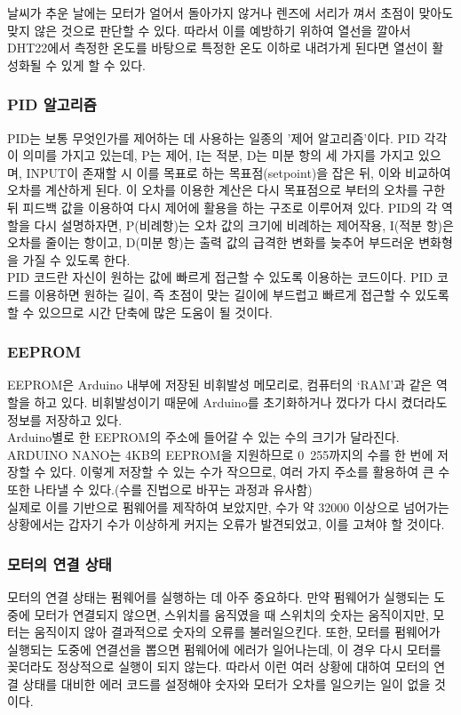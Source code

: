 날씨가 추운 날에는 모터가 얼어서 돌아가지 않거나 렌즈에 서리가 껴서 초점이 맞아도 맞지 않은 것으로 판단할 수 있다. 따라서 이를 예방하기 위하여 열선을 깔아서 DHT22에서 측정한 온도를 바탕으로 특정한 온도 이하로 내려가게 된다면 열선이 활성화될 수 있게 할 수 있다.

\subsubsection{PID 알고리즘}

PID는 보통 무엇인가를 제어하는 데 사용하는 일종의 ’제어 알고리즘’이다. PID 각각이 의미를 가지고 있는데, P는 제어, I는 적분, D는 미분 항의 세 가지를 가지고 있으며, INPUT이 존재할 시 이를 목표로 하는 목표점(setpoint)을 잡은 뒤, 이와 비교하여 오차를 계산하게 된다. 이 오차를 이용한 계산은 다시 목표점으로 부터의 오차를 구한 뒤 피드백 값을 이용하여 다시 제어에 활용을 하는 구조로 이루어져 있다.
PID의 각 역할을 다시 설명하자면, P(비례항)는 오차 값의 크기에 비례하는 제어작용, I(적분 항)은 오차를 줄이는 항이고, D(미분 항)는 출력 값의 급격한 변화를 늦추어 부드러운 변화형을 가질 수 있도록 한다.\\
PID 코드란 자신이 원하는 값에 빠르게 접근할 수 있도록 이용하는 코드이다. PID 코드를 이용하면 원하는 길이, 즉 초점이 맞는 길이에 부드럽고 빠르게 접근할 수 있도록 할 수 있으므로 시간 단축에 많은 도움이 될 것이다.

\subsubsection{EEPROM}

EEPROM은 Arduino 내부에 저장된 비휘발성 메모리로, 컴퓨터의 ‘RAM’과 같은 역할을 하고 있다. 비휘발성이기 때문에 Arduino를 초기화하거나 껐다가 다시 켰더라도 정보를 저장하고 있다.\\
Arduino별로 한 EEPROM의 주소에 들어갈 수 있는 수의 크기가 달라진다. ARDUINO NANO는 4KB의 EEPROM을 지원하므로 0~255까지의 수를 한 번에 저장할 수 있다. 이렇게 저장할 수 있는 수가 작으므로, 여러 가지 주소를 활용하여 큰 수 또한 나타낼 수 있다.(수를 진법으로 바꾸는 과정과 유사함)\\
실제로 이를 기반으로 펌웨어를 제작하여 보았지만, 수가 약 32000 이상으로 넘어가는 상황에서는 갑자기 수가 이상하게 커지는 오류가 발견되었고, 이를 고쳐야 할 것이다.

\subsubsection{모터의 연결 상태}

모터의 연결 상태는 펌웨어를 실행하는 데 아주 중요하다. 만약 펌웨어가 실행되는 도중에 모터가 연결되지 않으면, 스위치를 움직였을 때 스위치의 숫자는 움직이지만, 모터는 움직이지 않아 결과적으로 숫자의 오류를 불러일으킨다. 또한, 모터를 펌웨어가 실행되는 도중에 연결선을 뽑으면 펌웨어에 에러가 일어나는데, 이 경우 다시 모터를 꽂더라도 정상적으로 실행이 되지 않는다. 따라서 이런 여러 상황에 대하여 모터의 연결 상태를 대비한 에러 코드를 설정해야 숫자와 모터가 오차를 일으키는 일이 없을 것이다.


